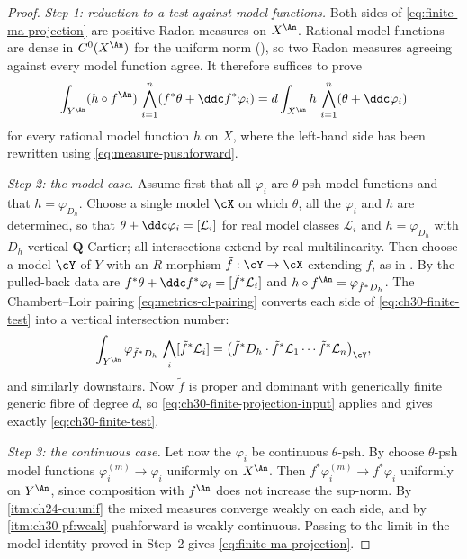 \begin{proof}
\emph{Step 1: reduction to a test against model functions.}  Both sides of
\eqref{eq:finite-ma-projection} are positive Radon measures on $X^{\An}$.
Rational model functions are dense in $C^0(X^{\An})$ for the uniform norm
(), so two Radon measures agreeing
against every model function agree.  It therefore suffices to prove
\begin{equation}
\label{eq:ch30-finite-test}
 \int_{Y^{\An}}(h\circ f^{\An})\,
  \bigwedge_{i=1}^n(f^*\theta+\ddc f^*\varphi_i)
 =d\int_{X^{\An}}h\,\bigwedge_{i=1}^n(\theta+\ddc\varphi_i)
\end{equation}
for every rational model function $h$ on $X$, where the left-hand side has been
rewritten using \eqref{eq:measure-pushforward}.

\emph{Step 2: the model case.}  Assume first that all $\varphi_i$ are
$\theta$-psh model functions and that $h=\varphi_{D_h}$.  Choose a
single model $\cX$ on which $\theta$, all the $\varphi_i$ and $h$
are determined, so that
$\theta+\ddc\varphi_i=[\mathcal L_i]$ for real model classes
$\mathcal L_i$ and $h=\varphi_{D_h}$ with $D_h$ vertical
$\mathbf Q$-Cartier; all intersections extend by real multilinearity.
Then choose a model $\cY$ of $Y$ with an $R$-morphism
$\tilde f:\cY\to\cX$ extending $f$, as in
.  By
 the pulled-back data are
$f^*\theta+\ddc f^*\varphi_i=[\tilde f^*\mathcal L_i]$ and
$h\circ f^{\An}=\varphi_{\tilde f^*D_h}$.  The Chambert--Loir pairing
\eqref{eq:metrics-cl-pairing} converts each side of
\eqref{eq:ch30-finite-test} into a vertical intersection number:
\[
 \int_{Y^{\An}}\varphi_{\tilde f^*D_h}\,
   \bigwedge_i[\tilde f^*\mathcal L_i]
 =\bigl(\tilde f^*D_h\cdot\tilde f^*\mathcal L_1\cdots
        \tilde f^*\mathcal L_n\bigr)_{\cY},
\]
and similarly downstairs.  Now $\tilde f$ is proper and dominant with
generically finite generic fibre of degree $d$, so
\eqref{eq:ch30-finite-projection-input} applies and gives exactly
\eqref{eq:ch30-finite-test}.

\emph{Step 3: the continuous case.}  Let now the $\varphi_i$ be
continuous $\theta$-psh.  By  choose
$\theta$-psh model functions $\varphi_i^{(m)}\to\varphi_i$ uniformly on
$X^{\An}$.  Then $f^*\varphi_i^{(m)}\to f^*\varphi_i$ uniformly on
$Y^{\An}$, since composition with $f^{\An}$ does not increase the
sup-norm.  By \,\cref{itm:ch24-cu:unif}
the mixed measures converge weakly on each side, and by
\,\cref{itm:ch30-pf:weak} pushforward is
weakly continuous.  Passing to the limit in the model identity proved in
Step~2 gives \eqref{eq:finite-ma-projection}.


\end{proof}
